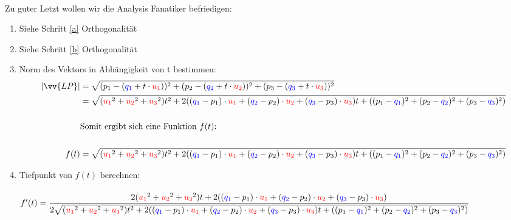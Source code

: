             \paragraph{} Zu guter Letzt wollen wir die Analysis Fanatiker befriedigen:
                \begin{enumerate}[1)]
                    \item Siehe Schritt \ref{a} Orthogonalität
                    \item Siehe Schritt \ref{b} Orthogonalität
                    \item Norm des Vektors in Abhängigkeit von t bestimmen:
                    \begin{align*}
                        |\vv{LP}| &= \sqrt{(p_1 - (\textcolor{blue}{q_1} + t \cdot \textcolor{red}{u_1}))^2 + (p_2 - (\textcolor{blue}{q_2} + t \cdot \textcolor{red}{u_2}))^2 + (p_3 - (\textcolor{blue}{q_3} + t\cdot \textcolor{red}{u_3}))^2} \\
                                  &= \sqrt{(\textcolor{red}{u_1}^2 + \textcolor{red}{u_2}^2 + \textcolor{red}{u_3}^2)t^2 + 2((\textcolor{blue}{q_1} - p_1) \cdot \textcolor{red}{u_1} + (\textcolor{blue}{q_2} - p_2) \cdot \textcolor{red}{u_2} + (\textcolor{blue}{q_3} - p_3) \cdot \textcolor{red}{u_3})t + ((p_1 - \textcolor{blue}{q_1})^2 + (p_2 - \textcolor{blue}{q_2})^2 + (p_3 - \textcolor{blue}{q_3})^2)} \\\\
                        & \text{Somit ergibt sich eine Funktion $f(t)$:} \\\\
                             f(t) &= \sqrt{(\textcolor{red}{u_1}^2 + \textcolor{red}{u_2}^2 + \textcolor{red}{u_3}^2)t^2 + 2((\textcolor{blue}{q_1} - p_1) \cdot \textcolor{red}{u_1} + (\textcolor{blue}{q_2} - p_2) \cdot \textcolor{red}{u_2} + (\textcolor{blue}{q_3} - p_3) \cdot \textcolor{red}{u_3})t + ((p_1 - \textcolor{blue}{q_1})^2 + (p_2 - \textcolor{blue}{q_2})^2 + (p_3 - \textcolor{blue}{q_3})^2)}
                    \end{align*}
                    \item Tiefpunkt von $f(t)$ berechnen:
                    \\\\
                    $f'(t) = \dfrac{2(\textcolor{red}{u_1}^2 + \textcolor{red}{u_2}^2 + \textcolor{red}{u_3}^2)t + 2((\textcolor{blue}{q_1} - p_1) \cdot \textcolor{red}{u_1} + (\textcolor{blue}{q_2} - p_2) \cdot \textcolor{red}{u_2} + (\textcolor{blue}{q_3} - p_3) \cdot \textcolor{red}{u_3})}{2\sqrt{(\textcolor{red}{u_1}^2 + \textcolor{red}{u_2}^2 + \textcolor{red}{u_3}^2)t^2 + 2((\textcolor{blue}{q_1} - p_1) \cdot \textcolor{red}{u_1} + (\textcolor{blue}{q_2} - p_2) \cdot \textcolor{red}{u_2} + (\textcolor{blue}{q_3} - p_3) \cdot \textcolor{red}{u_3})t + ((p_1 - \textcolor{blue}{q_1})^2 + (p_2 - \textcolor{blue}{q_2})^2 + (p_3 - \textcolor{blue}{q_3})^2)}}$

\end{enumerate}
